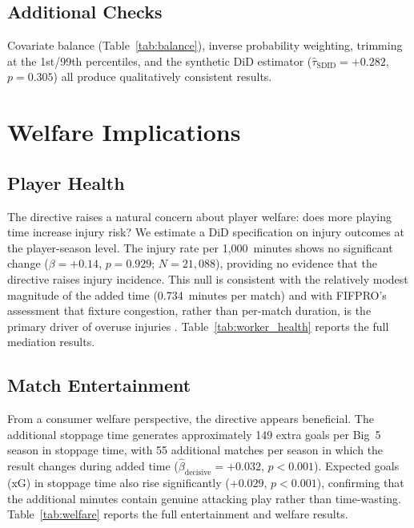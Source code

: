 \documentclass[12pt]{article}
\begin{document}
\subsection{Additional Checks}

Covariate balance (Table~\ref{tab:balance}), inverse probability
weighting, trimming at the 1st/99th percentiles, and the synthetic DiD
estimator ($\hat{\tau}_{\text{SDID}} = +0.282$, $p = 0.305$) all
produce qualitatively consistent results.








\section{Welfare Implications}\label{sec:welfare}

\subsection{Player Health}

The directive raises a natural concern about player welfare: does more
playing time increase injury risk? We estimate a DiD specification on
injury outcomes at the player-season level. The injury rate per
1,000~minutes shows no significant change ($\beta = +0.14$,
$p = 0.929$; $N = 21{,}088$), providing no evidence that the directive
raises injury incidence. This null is consistent with the relatively modest magnitude of the added
time (0.734~minutes per match) and with FIFPRO's assessment that
fixture congestion, rather than per-match duration, is the primary
driver of overuse injuries \citep{fifpro2023workload}.
Table~\ref{tab:worker_health} reports the full mediation results.



\subsection{Match Entertainment}

From a consumer welfare perspective, the directive appears
beneficial. The additional stoppage time generates approximately 149
extra goals per Big~5 season in stoppage time, with 55 additional
matches per season in which the result changes during added time
($\hat{\beta}_{\text{decisive}} = +0.032$, $p < 0.001$). Expected goals
(xG) in stoppage time also rise significantly ($+0.029$, $p < 0.001$),
confirming that the additional minutes contain genuine attacking play
rather than time-wasting. Table~\ref{tab:welfare} reports the full
entertainment and welfare results.
\end{document}
